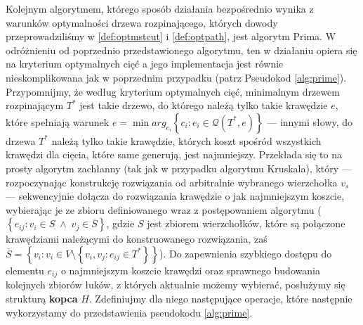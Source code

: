 Kolejnym algorytmem, którego sposób działania bezpośrednio wynika z warunków optymalności drzewa rozpinającego, których dowody przeprowadziliśmy w \ref{def:optmstcut} i \ref{def:optpath}, jest algorytm Prima. W odróżnieniu od poprzednio przedstawionego algorytmu, ten w działaniu opiera się na kryterium optymalnych cięć a jego implementacja jest równie nieskomplikowana jak w poprzednim przypadku (patrz Pseudokod \ref{alg:prime}). Przypomnijmy, że według kryterium optymalnych cięć, minimalnym drzewem rozpinającym $T^{\ast}$ jest takie drzewo, do którego należą tylko takie krawędzie $e$, które spełniają warunek $e = \min arg_{e_{i}} \left\{ c_{i} : e_{i} \in \mathcal{Q} \left( T^{\ast}, e \right) \right\}$ --- innymi słowy, do drzewa $T^{\ast}$ należą tylko takie krawędzie, których koszt spośród wszystkich krawędzi dla cięcia, które same generują, jest najmniejszy. Przekłada się to na prosty algorytm zachłanny (tak jak w przypadku algorytmu Kruskala), który --- rozpoczynając konstrukcję rozwiązania od arbitralnie wybranego wierzchołka $v_{s}$ --- sekwencyjnie dołącza do rozwiązania krawędzie o jak najmniejszym koszcie, wybierając je ze zbioru definiowanego wraz z postępowaniem algorytmu ($\left\{ e_{ij} : v_{i} \in S \; \wedge \; v_{j} \in \overline{S} \right\}$, gdzie $S$ jest zbiorem wierzchołków, które są połączone krawędziami należącymi do konstruowanego rozwiązania, zaś $\overline{S} = \left\{ v_{i} : v_{i} \in V \setminus \left\{ v_{i}, v_{j} : e_{ij} \in T^{\ast} \right\} \right\}$). Do zapewnienia szybkiego dostępu do elementu $e_{ij}$ o najmniejszym koszcie krawędzi oraz sprawnego budowania kolejnych zbiorów łuków, z których aktualnie możemy wybierać, posłużymy się strukturą \textbf{kopca} $H$. Zdefiniujmy dla niego następujące operacje, które następnie wykorzystamy do przedstawienia pseudokodu \ref{alg:prime}.

